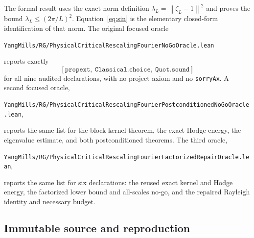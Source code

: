 \documentclass[11pt]{article}
\theoremstyle{definition}
\newcommand{\norm}[1]{\left\lVert #1\right\rVert}
\newcommand{\lean}[1]{\texttt{#1}}
\newcommand{\codepath}[1]{\nolinkurl{#1}}
\begin{document}
The formal result uses the exact norm definition
$\lambda_L=\norm{\zeta_L-1}^2$ and proves the bound
$\lambda_L\le(2\pi/L)^2$.  Equation~\eqref{eq:sin} is the elementary
closed-form identification of that norm.  The original focused oracle
\begin{center}
\codepath{YangMills/RG/PhysicalCriticalRescalingFourierNoGoOracle.lean}
\end{center}
reports exactly
\[
 [\lean{propext},\ \lean{Classical.choice},\ \lean{Quot.sound}]
\]
for all nine audited declarations, with no project axiom and no
\lean{sorryAx}.  A second focused oracle,
\begin{center}
\codepath{YangMills/RG/PhysicalCriticalRescalingFourierPostconditionedNoGoOracle.lean},
\end{center}
reports the same list for the block-kernel theorem, the exact Hodge energy,
the eigenvalue estimate, and both postconditioned theorems.  The third oracle,
\begin{center}
\codepath{YangMills/RG/PhysicalCriticalRescalingFourierFactorizedRepairOracle.lean},
\end{center}
reports the same list for six declarations: the reused exact kernel and Hodge
energy, the factorized lower bound and all-scales no-go, and the repaired
Rayleigh identity and necessary budget.

\subsection*{Immutable source and reproduction}
\end{document}
